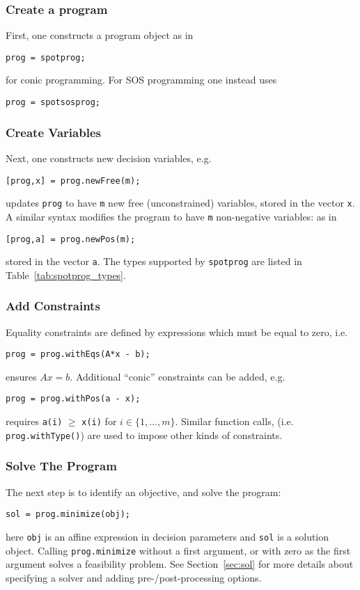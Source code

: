 \documentclass{scrartcl}
\newcommand{\li}[1]{\lstinline{#1}}
\newcommand{\spotprog}{\lstinline{spotprog}\xspace}
\begin{document}
\subsubsection{Create a program} First, one constructs a program object as in
\begin{lstlisting}[firstnumber=1,frame=none]
  prog = spotprog;
\end{lstlisting}
for conic programming. For SOS programming one instead uses
\begin{lstlisting}[numbers=none,frame=none]
  prog = spotsosprog;
\end{lstlisting}
\subsubsection{Create Variables}
  Next, one constructs new decision variables, e.g.
\begin{lstlisting}[frame=none,firstnumber=2]
[prog,x] = prog.newFree(m);
\end{lstlisting}
updates \lstinline{prog} to have \li{m} new free (unconstrained) variables, stored in the vector \li{x}.
A similar syntax modifies the program to have \li{m} non-negative variables:
as in
\begin{lstlisting}[frame=none,firstnumber=5]
[prog,a] = prog.newPos(m);
\end{lstlisting}
stored in the vector \li{a}.  The types supported by \spotprog are  listed in Table~\ref{tab:spotprog_types}.  
\subsubsection{Add Constraints}
  Equality constraints are defined by expressions which must be equal to zero, i.e.
\begin{lstlisting}[frame=none,firstnumber=3]
prog = prog.withEqs(A*x - b);
\end{lstlisting}
ensures $Ax = b$.  Additional ``conic'' constraints can be added, e.g.
\begin{lstlisting}[frame=none,firstnumber=6]
prog = prog.withPos(a - x);
\end{lstlisting}
  requires \lstinline{a(i)} $\geq$ \lstinline{x(i)} for $i \in \{1,\ldots,m\}$.
  Similar function calls, (i.e. \lstinline{prog.withType()}) are used to impose other kinds of constraints.
\subsubsection{Solve The Program}
The next step is to identify an objective, and solve the program:
\begin{lstlisting}[frame=none,firstnumber=11]
sol = prog.minimize(obj);
\end{lstlisting}
here \li{obj} is an affine expression in decision parameters and \li{sol} is a solution object.
Calling \li{prog.minimize} without a first argument, or with zero as the first argument solves a feasibility problem.  See Section~\ref{sec:sol} for more details about specifying a solver and adding pre-/post-processing options.
\end{document}
